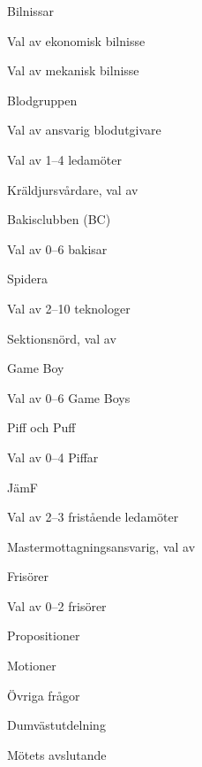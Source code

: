 \documentclass{sektionsmote}
\begin{document}
\begin{ootd}
\begin{ootd}
    \item Bilnissar
    \begin{ootd}
        \item Val av ekonomisk bilnisse
        \item Val av mekanisk bilnisse
    \end{ootd}
    \item Blodgruppen
    \begin{ootd}
        \item Val av ansvarig blodutgivare
        \item Val av 1--4 ledamöter
    \end{ootd}
    \item Kräldjursvårdare, val av
    \item Bakisclubben (BC)
    \begin{ootd}
        \item Val av 0--6 bakisar
    \end{ootd}
    \item Spidera
    \begin{ootd}
        \item Val av 2--10 teknologer
    \end{ootd}
    \item Sektionsnörd, val av
    \item Game Boy
    \begin{ootd}
        \item Val av 0--6 Game Boys
    \end{ootd}
    \item Piff och Puff
    \begin{ootd}
        \item Val av 0--4 Piffar
    \end{ootd}
    \item JämF
    \begin{ootd}
        \item Val av 2--3 fristående ledamöter
    \end{ootd}
    \item Mastermottagningsansvarig, val av
    \item Frisörer
    \begin{ootd}
        \item Val av 0--2 frisörer
    \end{ootd}
\end{ootd}

\item{Propositioner}

\item{Motioner}

\item{Övriga frågor}

\item{Dumvästutdelning}

\item{Mötets avslutande}
\end{ootd}
\end{document}
